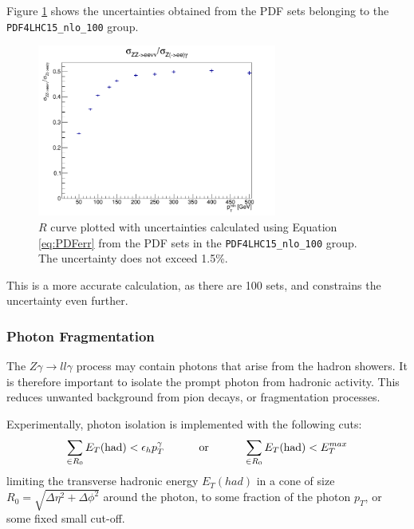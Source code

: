 \documentclass[11pt,a4paper,final]{report}
\newcommand{\Zgam}{$Z\gamma\rightarrow ll\gamma$ }
\begin{document}
Figure \ref{fig:pdfcompare_100} shows the uncertainties obtained from the PDF sets belonging to the \texttt{PDF4LHC15\_nlo\_100} group.
\begin{figure}[H]
\centering
	\includegraphics[width=0.7\textwidth]{PDF_100_unc.png}
	\caption{$R$ curve plotted with uncertainties calculated using Equation \ref{eq:PDFerr} from the PDF sets in the \texttt{PDF4LHC15\_nlo\_100} group. The uncertainty does not exceed 1.5\%.}
	\label{fig:pdfcompare_100}
\end{figure}
This is a more accurate calculation, as there are 100 sets, and constrains the uncertainty even further.

\subsubsection{Photon Fragmentation}
The \Zgam process may contain photons that arise from the hadron showers. It is therefore important to isolate the prompt photon from hadronic activity. This reduces unwanted background from pion decays, or fragmentation processes.

Experimentally, photon isolation is implemented with the following cuts:
\begin{equation}
\sum_{\in R_0} E_T(\text{had}) < \epsilon_h p_T^\gamma \text{\hspace{1cm} or \hspace{1cm}} \sum_{\in R_0} E_T(\text{had}) < E_T^{max}
\end{equation}
\label{eq:photon_isol}
limiting the transverse hadronic energy $E_T(had)$ in a cone of size $R_0 = \sqrt{\Delta\eta^2 + \Delta\phi^2}$ around the photon, to some fraction of the photon $p_T$, or some fixed small cut-off.
\end{document}
